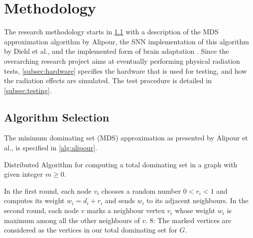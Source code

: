 \section{Methodology}\label{sec:methodology}
The research methodology starts in \cref{subsec:algorithm} with a description of the MDS approximation algorithm by Alipour, the SNN implementation of this algorithm by Diehl et al., and the implemented form%
of brain adaptation \cite{alipour}\cite{diehl}. Since the overarching research project aims at eventually performing physical radiation tests, \cref{subsec:hardware} specifies the hardware that is used for testing, and how the radiation effects are simulated. The test procedure is detailed in \cref{subsec:testing}.

\subsection{Algorithm Selection}\label{subsec:algorithm}
The minimum dominating set (MDS) approximation as presented by Alipour et al., is specified in \cref{alg:alipour}.
\begin{algorithm}[h]%
    \caption{Distributed Algorithm for computing a total dominating set in a graph with given integer $m\geq 0$.}\label{alg:alipour}
    In the first round, each node $v_i$ chooses a random number $0<r_i<1$ and computes its weight $w_i=d_i+r_i$ and sends $w_i$ to its
    adjacent neighbours.\;
    In the second round, each node $v$ marks a neighbour vertex $v_i$ whose weight $w_i$ is maximum among all the other neighbours of $v$.\;
    8: The marked vertices are considered as the vertices in our total dominating set for $G$.\;
\end{algorithm}

